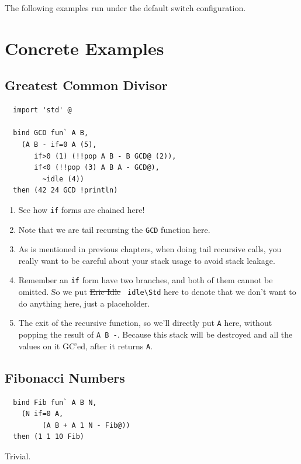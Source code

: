 \documentclass{report}
\newcommand{\mstd}[1]{\texttt{#1\textbackslash Std}}
\newcommand{\mtilde}[1]{\textasciitilde}
\begin{document}
The following examples run under the default switch configuration.

\section{Concrete Examples}

\subsection{Greatest Common Divisor}
\begin{mdframed}[style=example]
\begin{verbatim}
  import 'std' @

  bind GCD fun` A B,
    (A B - if=0 A (5),
       if>0 (1) (!!pop A B - B GCD@ (2)),
       if<0 (!!pop (3) A B A - GCD@),
         ~idle (4))
  then (42 24 GCD !println)
\end{verbatim}
\end{mdframed}

\begin{enumerate}
\item See how \texttt{if} forms are chained here!
\item Note that we are tail recursing the \texttt{GCD} function here.
\item As is mentioned in previous chapters, when doing tail recursive calls, you really want to be careful about your stack usage to avoid stack leakage.
\item Remember an \texttt{if} form have two branches, and both of them cannot be omitted. So we put \sout{Eric Idle} \mstd{\mtilde ~idle} here to denote that we don't want to do anything here, just a placeholder.
\item The exit of the recursive function, so we'll directly put \texttt{A} here, without popping the result of \texttt{A B -}. Because this stack will be destroyed and all the values on it GC'ed, after it returns \texttt{A}.
\end{enumerate}

\subsection{Fibonacci Numbers}
\begin{mdframed}[style=example]
\begin{verbatim}
  bind Fib fun` A B N,
    (N if=0 A,
         (A B + A 1 N - Fib@))
  then (1 1 10 Fib)
\end{verbatim}
\end{mdframed}
Trivial.
\end{document}
